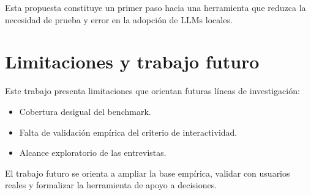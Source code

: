 \documentclass{llncs}
\begin{document}
Esta propuesta constituye un primer paso hacia una herramienta que reduzca la necesidad de prueba y error en la adopción de LLMs locales.

\section{Limitaciones y trabajo futuro}\label{limitaciones}

Este trabajo presenta limitaciones que orientan futuras líneas de investigación:

\begin{itemize}
    \item Cobertura desigual del benchmark.
    \item Falta de validación empírica del criterio de interactividad.
    \item Alcance exploratorio de las entrevistas.
\end{itemize}

El trabajo futuro se orienta a ampliar la base empírica, validar con usuarios reales y formalizar la herramienta de apoyo a decisiones.
\end{document}
